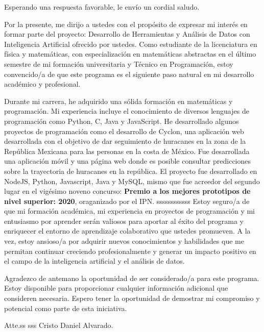 \documentclass[11pt,a4paper,sans]{moderncv}        %
\begin{document}
\date{1 de enero de 2025}
\opening{}
\closing{Esperando una respuesta favorable, le envío un cordial saludo.}

\makelettertitle

\justifying

Por la presente, me dirijo a ustedes con el propósito de expresar mi interés en formar parte del proyecto: Desarrollo de Herramientas y Análisis de Datos con Inteligencia Artificial ofrecido por ustedes. Como estudiante de la licenciatura en física y matemáticas, con especialización en matemáticas abstractas en el último semestre de mi formación universitaria y Técnico en Programación, estoy convencido/a de que este programa es el siguiente paso natural en mi desarrollo académico y profesional.

Durante mi carrera, he adquirido una sólida formación en matemáticas y programación. Mi experiencia incluye el conocimiento de diversos lenguajes de programación como Python, C, Java y JavaScript. He desarrollado algunos proyectos de programación como el desarrollo de Cyclon, una aplicación web desarrollada con el objetivo de dar seguimiento de huracanes en la zona de la República Mexicana para las personas en la costa de México. Fue desarrollada una aplicación móvil y una página web donde es posible consultar predicciones sobre la trayectoria de huracanes en la república. El proyecto fue desarrollado en NodeJS, Python, Javascript, Java y MySQL, mismo que fue acreedor del segundo lugar en el vigésimo noveno concurso: \textbf{Premio a los mejores prototipos de nivel superior: 2020}, oraganizado por el IPN.
ssssssssssss
Estoy seguro/a de que mi formación académica, mi experiencia en proyectos de programación y mi entusiasmo por aprender serán valiosos para aportar al éxito del programa y enriquecer el entorno de aprendizaje colaborativo que ustedes promueven. A la vez, estoy ansioso/a por adquirir nuevos conocimientos y habilidades que me permitan continuar creciendo profesionalmente y generar un impacto positivo en el campo de la inteligencia artificial y el análisis de datos.

Agradezco de antemano la oportunidad de ser considerado/a para este programa. Estoy disponible para proporcionar cualquier información adicional que consideren necesaria. Espero tener la oportunidad de demostrar mi compromiso y potencial como parte de esta iniciativa.

Atte.ss
sss
Cristo Daniel Alvarado.
\end{document}
